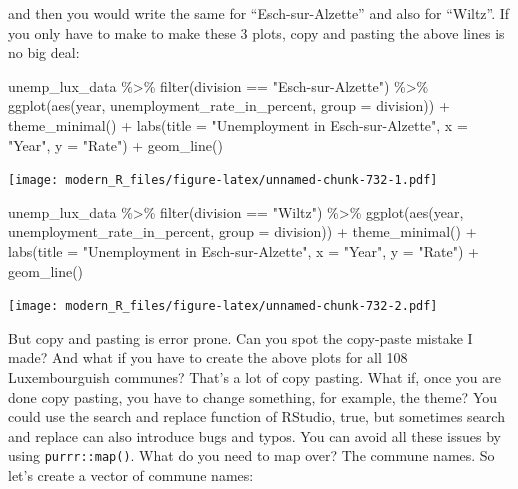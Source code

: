 \documentclass[
]{article}
\newenvironment{Shaded}{\begin{snugshade}}{\end{snugshade}}
\newcommand{\AttributeTok}[1]{\textcolor[rgb]{0.77,0.63,0.00}{#1}}
\newcommand{\FunctionTok}[1]{\textcolor[rgb]{0.00,0.00,0.00}{#1}}
\newcommand{\NormalTok}[1]{#1}
\newcommand{\SpecialCharTok}[1]{\textcolor[rgb]{0.00,0.00,0.00}{#1}}
\newcommand{\StringTok}[1]{\textcolor[rgb]{0.31,0.60,0.02}{#1}}
\begin{document}
and then you would write the same for ``Esch-sur-Alzette'' and also for ``Wiltz''. If you only have to
make to make these 3 plots, copy and pasting the above lines is no big deal:

\begin{Shaded}
\begin{Highlighting}[]
\NormalTok{unemp\_lux\_data }\SpecialCharTok{\%\textgreater{}\%}
  \FunctionTok{filter}\NormalTok{(division }\SpecialCharTok{==} \StringTok{"Esch{-}sur{-}Alzette"}\NormalTok{) }\SpecialCharTok{\%\textgreater{}\%}
  \FunctionTok{ggplot}\NormalTok{(}\FunctionTok{aes}\NormalTok{(year, unemployment\_rate\_in\_percent, }\AttributeTok{group =}\NormalTok{ division)) }\SpecialCharTok{+}
  \FunctionTok{theme\_minimal}\NormalTok{() }\SpecialCharTok{+}
  \FunctionTok{labs}\NormalTok{(}\AttributeTok{title =} \StringTok{"Unemployment in Esch{-}sur{-}Alzette"}\NormalTok{, }\AttributeTok{x =} \StringTok{"Year"}\NormalTok{, }\AttributeTok{y =} \StringTok{"Rate"}\NormalTok{) }\SpecialCharTok{+}
  \FunctionTok{geom\_line}\NormalTok{()}
\end{Highlighting}
\end{Shaded}

\texttt{[image: modern\_R\_files/figure-latex/unnamed-chunk-732-1.pdf]}

\begin{Shaded}
\begin{Highlighting}[]
\NormalTok{unemp\_lux\_data }\SpecialCharTok{\%\textgreater{}\%}
  \FunctionTok{filter}\NormalTok{(division }\SpecialCharTok{==} \StringTok{"Wiltz"}\NormalTok{) }\SpecialCharTok{\%\textgreater{}\%}
  \FunctionTok{ggplot}\NormalTok{(}\FunctionTok{aes}\NormalTok{(year, unemployment\_rate\_in\_percent, }\AttributeTok{group =}\NormalTok{ division)) }\SpecialCharTok{+}
  \FunctionTok{theme\_minimal}\NormalTok{() }\SpecialCharTok{+}
  \FunctionTok{labs}\NormalTok{(}\AttributeTok{title =} \StringTok{"Unemployment in Esch{-}sur{-}Alzette"}\NormalTok{, }\AttributeTok{x =} \StringTok{"Year"}\NormalTok{, }\AttributeTok{y =} \StringTok{"Rate"}\NormalTok{) }\SpecialCharTok{+}
  \FunctionTok{geom\_line}\NormalTok{()}
\end{Highlighting}
\end{Shaded}

\texttt{[image: modern\_R\_files/figure-latex/unnamed-chunk-732-2.pdf]}

But copy and pasting is error prone. Can you spot the copy-paste mistake I made? And what if you
have to create the above plots for all 108 Luxembourguish communes? That's a lot of copy pasting.
What if, once you are done copy pasting, you have to change something, for example, the theme? You
could use the search and replace function of RStudio, true, but sometimes search and replace can
also introduce bugs and typos. You can avoid all these issues by using \texttt{purrr::map()}. What do you
need to map over? The commune names. So let's create a vector of commune names:
\end{document}
